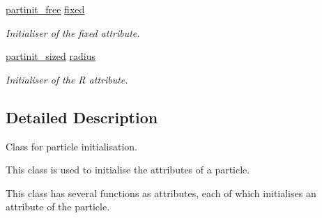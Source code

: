 \begin{DoxyCompactItemize}
\hyperlink{namespacephysim_1_1init_a075c918c300c8a7eb1e3449f8848be22}{partinit\+\_\+free} \hyperlink{classphysim_1_1init_1_1initialiser_a0deb0d7e29b824274c4cd81306b42465}{fixed}
\begin{DoxyCompactList}\small\item\em Initialiser of the \textquotesingle{}fixed\textquotesingle{} attribute. \end{DoxyCompactList}\item 
\mbox{\label{classphysim_1_1init_1_1initialiser_a883682307e10c2204e0ea5ec5b217e81}} 
\hyperlink{namespacephysim_1_1init_a366bf3e2a64457ad4e3b16c6d671bf7c}{partinit\+\_\+sized} \hyperlink{classphysim_1_1init_1_1initialiser_a883682307e10c2204e0ea5ec5b217e81}{radius}
\begin{DoxyCompactList}\small\item\em Initialiser of the \textquotesingle{}R\textquotesingle{} attribute. \end{DoxyCompactList}\end{DoxyCompactItemize}


\subsection{Detailed Description}
Class for particle initialisation. 

This class is used to initialise the attributes of a particle.

This class has several functions as attributes, each of which initialises an attribute of the particle.

